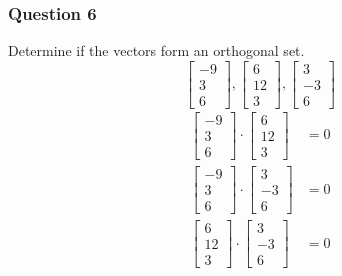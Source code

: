 \documentclass{math}
\begin{document}
\subsubsection*{Question 6}
Determine if the vectors form an orthogonal set.
\[ \begin{bmatrix}-9 \\ 3 \\ 6\end{bmatrix},
  \begin{bmatrix}6 \\ 12 \\ 3\end{bmatrix},
  \begin{bmatrix}3 \\ -3 \\ 6\end{bmatrix} \]
\begin{align*}
  \begin{bmatrix}-9 \\ 3 \\ 6\end{bmatrix}\cdot
    \begin{bmatrix}6 \\ 12 \\ 3\end{bmatrix} &= 0 \\
  \begin{bmatrix}-9 \\ 3 \\ 6\end{bmatrix}\cdot
    \begin{bmatrix}3 \\ -3 \\ 6\end{bmatrix} &= 0 \\
  \begin{bmatrix}6 \\ 12 \\ 3\end{bmatrix}\cdot
    \begin{bmatrix}3 \\ -3 \\ 6\end{bmatrix} &= 0
\end{align*}
\end{document}
